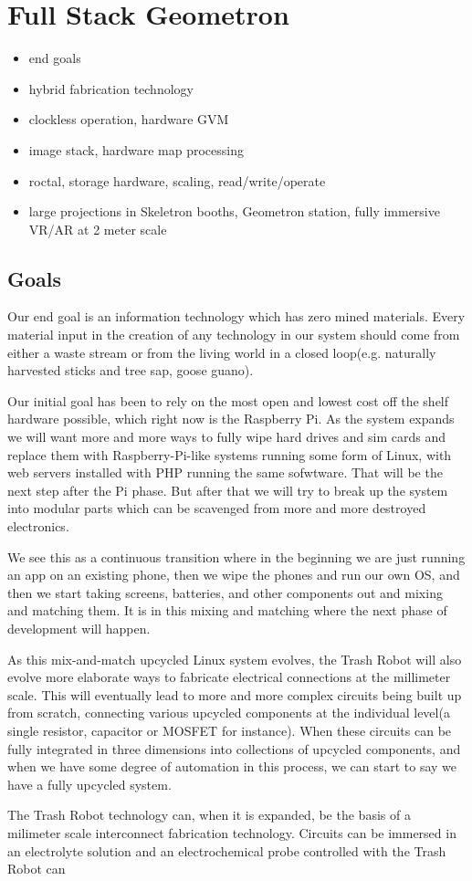 \section{Full Stack Geometron}
\begin{itemize}
\tightlist
\item
end goals
\item
hybrid fabrication technology
\item
clockless operation, hardware GVM
\item
image stack, hardware map processing
\item
roctal, storage hardware, scaling, read/write/operate
\item
large projections in Skeletron booths, Geometron station, fully immersive VR/AR at 2 meter scale
\end{itemize}

\subsection{Goals}

Our end goal is an information technology which has zero mined materials.  Every material input in the creation of any technology in our system should come from either a waste stream or from the living world in a closed loop(e.g. naturally harvested sticks and tree sap, goose guano). 

Our initial goal has been to rely on the most open and lowest cost off the shelf hardware possible, which right now is the Raspberry Pi.  As the system expands we will want more and more ways to fully wipe hard drives and sim cards and replace them with Raspberry-Pi-like systems running some form of Linux, with web servers installed with PHP running the same sofwtware. That will be the next step after the Pi phase.  But after that we will try to break up the system into modular parts which can be scavenged from more and more destroyed electronics.  

We see this as a continuous transition where in the beginning we are just running an app on an existing phone, then we wipe the phones and run our own OS, and then we start taking screens, batteries, and other components out and mixing and matching them.  It is in this mixing and matching where the next phase of development will happen.

As this mix-and-match upcycled Linux system evolves, the Trash Robot will also evolve more elaborate ways to fabricate electrical connections at the millimeter scale.  This will eventually lead to more and more complex circuits being built up from scratch, connecting various upcycled components at the individual level(a single resistor, capacitor or MOSFET for instance).  When these circuits can be fully integrated in three dimensions into collections of upcycled components, and when we have some degree of automation in this process, we can start to say we have a fully upcycled system.


The Trash Robot technology can, when it is expanded, be the basis of a milimeter scale interconnect fabrication technology.  Circuits can be immersed in an electrolyte solution and an electrochemical probe controlled with the Trash Robot can 
